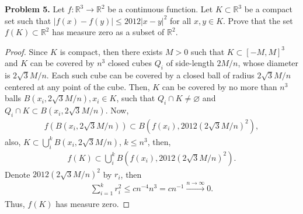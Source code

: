 \documentclass[12pt,leqno]{amsart}
\theoremstyle{definition}
\begin{document}
\noindent
{\bf Problem 5.}
Let $f:\mathbb{R}^3\to\mathbb{R}^2$ be a continuous function. Let $K\subset\mathbb{R}^3$ be a compact set such that $|f(x)-f(y)|\leq 2012|x-y|^{2}$
for all $x,y\in K$. Prove that the set $f(K)\subset\mathbb{R}^2$ has measure zero as a subset of $\mathbb{R}^2$.
\begin{proof}
Since $K$ is compact, then there exists $M > 0$ such that $K \subset [-M,M]^3$ and $K$ can be covered by $n^3$ closed cubes $Q_i$ of side-length $2M/n$, whose diameter is $2\sqrt{3}M/n$. Each such cube can be covered by a closed ball of radius $2\sqrt{3}M/n$ centered at any point of the cube. Then, $K$ can be covered by no more than $n^3$ balls $B\left(x_i, 2\sqrt{3}M/n\right), x_i \in K$, such that $Q_i \cap K \neq \varnothing$ and $Q_i \cap K \subset B\left(x_i, 2\sqrt{3}M/n\right)$. Now, 
\begin{align*}
    f\left( B\left(x_i, 2\sqrt{3}M/n\right)\right) \subset B \left(f(x_i), 2012 \left(2\sqrt{3}M/n\right)^2 \right),
\end{align*}
also, $K \subset \bigcup^k_i B\left(x_i, 2\sqrt{3}M/n\right)$, $k \leq n^3$, then,
\begin{align*}
    f(K) \subset \bigcup^k_i B \left(f(x_i), 2012 \left(2\sqrt{3}M/n\right)^2 \right).
\end{align*}
Denote $2012 \left(2\sqrt{3}M/n\right)^2$ by $r_i$, then
\begin{align*}
    \sum^k_{i=1} r_i^2 \leq c n^{-4} n^3 = c n^{-1} \xrightarrow[]{n\to\infty} 0.
\end{align*}
Thus, $f(K)$ has measure zero.
\end{proof}



\medskip
\end{document}
